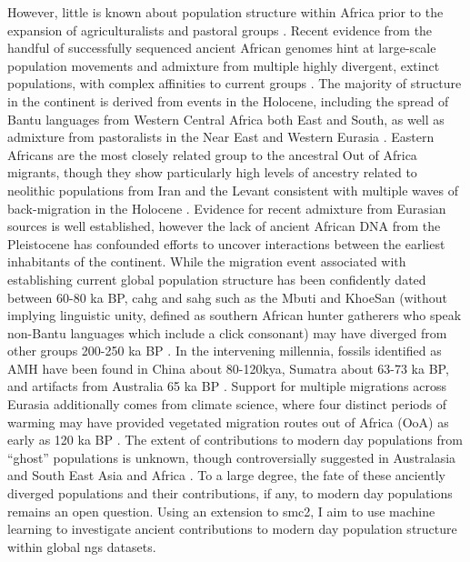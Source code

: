 However, little is known about population structure within Africa prior to the expansion of agriculturalists and pastoral groups \cite{Busby2016, Patin2017}. Recent evidence from the handful of successfully sequenced ancient African genomes hint at large-scale population movements and admixture from multiple highly divergent, extinct populations, with complex affinities to current groups \cite{Skoglund2018, Lipson2019, GallegoLlorente2015a}. The majority of structure in the continent is derived from events in the Holocene, including the spread of Bantu languages from Western Central Africa both East and South, as well as admixture from pastoralists in the Near East and Western Eurasia \cite{Busby2016}. Eastern Africans are the most closely related group to the ancestral Out of Africa migrants, though they show particularly high levels of ancestry related to neolithic populations from Iran and the Levant consistent with multiple waves of back-migration in the Holocene \cite{Skoglund2017}.  
Evidence for recent admixture from Eurasian sources is well established, however the lack of ancient African DNA from the Pleistocene has confounded efforts to uncover interactions between the earliest inhabitants of the continent.
While the migration event associated with establishing current global population structure has been confidently dated between 60-80 ka BP, \gls{cahg} and \gls{sahg} such as the Mbuti and KhoeSan (without implying linguistic unity, defined as southern African hunter gatherers who speak non-Bantu languages which include a click consonant) may have diverged from other groups 200-250 ka BP \cite{Lipson2019, Schlebusch2017}. 
In the intervening millennia, fossils identified as AMH have been found in China about 80-120kya, Sumatra about 63-73 ka BP, and artifacts from Australia 65 ka BP \cite{Clarkson2017, Liu2015, Westaway2017}.
Support for multiple migrations across Eurasia additionally comes from climate science, where four distinct periods of warming may have provided vegetated migration routes out of Africa (OoA) as early as 120 ka BP \cite{Timmermann2016}.
The extent of contributions to modern day populations from ``ghost'' populations is unknown, though controversially suggested in Australasia and South East Asia \cite{Malaspinas2016, Mallick2016, Pagani2016, Rasmussen2011, Skoglund2015} and Africa  \cite{Durvasula2019, Speidel2019, Lipson2019, Hammer2011, Plagnol2006, Ragsdale2019}.
To a large degree, the fate of these anciently diverged populations and their contributions, if any, to modern day populations remains an open question. 
Using an extension to \gls{smc2}, I aim to use machine learning to investigate ancient contributions to modern day population structure within global \gls{ngs} datasets.



